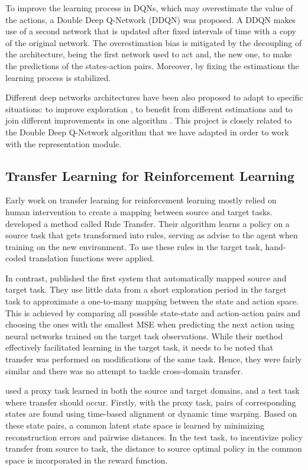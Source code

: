 To improve the learning process in DQNs, which may overestimate the value of the actions, a Double Deep Q-Network (DDQN) \citep{DDQN} was proposed. A DDQN makes use of a second network that is updated after fixed intervals of time with a copy of the original network. The overestimation bias is mitigated by the decoupling of the architecture, being the first network used to act and, the new one, to make the predictions of the states-action pairs. Moreover, by fixing the estimations the learning process is stabilized.

Different deep networks architectures have been also proposed to adapt to specific situations: to improve exploration \citep{noisy_dqn, hierarchical_dqn}, to benefit from different estimations \citep{DuelingDQN, distributional_dqn} and to join different improvements in one algorithm \citep{rainbow}. This project is closely related to the Double Deep Q-Network algorithm \citep{DDQN} that we have adapted in order to work with the representation module.

\subsection{Transfer Learning for Reinforcement Learning}
Early work on transfer learning for reinforcement learning mostly relied on human intervention to create a mapping between source and target tasks. \citet{taylor2007cross} developed a method called Rule Transfer. Their algorithm learns a policy on a source task that gets transformed into rules, serving as advise to the agent when training on the new environment. To use these rules in the target task, hand-coded translation functions were applied.

In contrast, \citet{taylor2008autonomous} published the first system that automatically mapped source and target task. They use little data from a short exploration period in the target task to approximate a one-to-many mapping between the state and action space. This is achieved by comparing all possible state-state and action-action pairs and choosing the ones with the smallest MSE when predicting the next action using neural networks trained on the target task observations. While their method effectively facilitated learning in the target task, it needs to be noted that transfer was performed on modifications of the same task. Hence, they were fairly similar and there was no attempt to tackle cross-domain transfer. 

\citet{gupta2017learning} used a proxy task learned in both the source and target domains, and a test task where transfer should occur. Firstly, with the proxy task, pairs of corresponding states are found using time-based alignment or dynamic time warping. Based on these state pairs, a common latent state space is learned by minimizing reconstruction errors and pairwise distances. In the test task, to incentivize policy transfer from source to task, the distance to source optimal policy in the common space is incorporated in the reward function.

